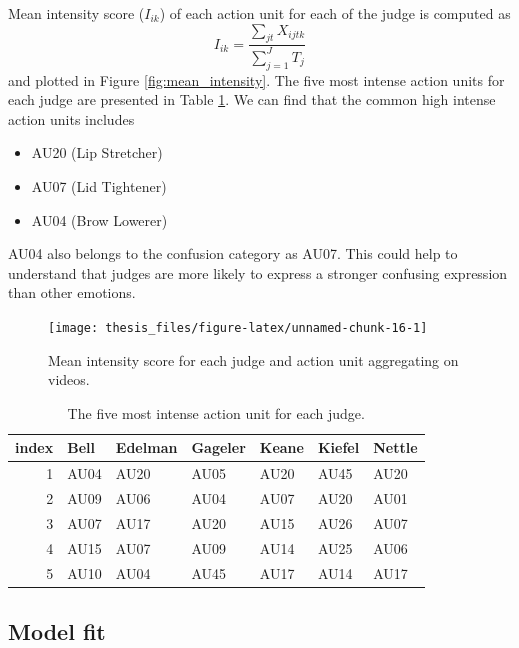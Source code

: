 \documentclass{monashthesis}
\begin{document}
Mean intensity score (\(I_{ik}\)) of each action unit for each of the judge is computed as \[I_{ik} = \frac{\sum_{jt}X_{ijtk}}{\sum_{j = 1}^JT_j}\] and plotted in Figure \ref{fig:mean_intensity}. The five most intense action units for each judge are presented in Table \ref{tab:most_intense}. We can find that the common high intense action units includes

\begin{itemize}
\tightlist
\item
  AU20 (Lip Stretcher)
\item
  AU07 (Lid Tightener)
\item
  AU04 (Brow Lowerer)
\end{itemize}

AU04 also belongs to the confusion category as AU07. This could help to understand that judges are more likely to express a stronger confusing expression than other emotions.

\begin{figure}
\texttt{[image: thesis\_files/figure-latex/unnamed-chunk-16-1]} \caption{Mean intensity score for each judge and action unit aggregating on videos.\label{fig:mean_intensity}}\label{fig:unnamed-chunk-16}
\end{figure}

\begin{table}[t]

\caption{\label{tab:unnamed-chunk-17}\label{tab:most_intense}The five most intense action unit for each judge.}
\centering
\begin{tabular}{r|l|l|l|l|l|l}
\hline
index & Bell & Edelman & Gageler & Keane & Kiefel & Nettle\\
\hline
1 & AU04 & AU20 & AU05 & AU20 & AU45 & AU20\\
\hline
2 & AU09 & AU06 & AU04 & AU07 & AU20 & AU01\\
\hline
3 & AU07 & AU17 & AU20 & AU15 & AU26 & AU07\\
\hline
4 & AU15 & AU07 & AU09 & AU14 & AU25 & AU06\\
\hline
5 & AU10 & AU04 & AU45 & AU17 & AU14 & AU17\\
\hline
\end{tabular}
\end{table}

\hypertarget{model-fit-2}{%
\subsection{Model fit}\label{model-fit-2}}
\end{document}
